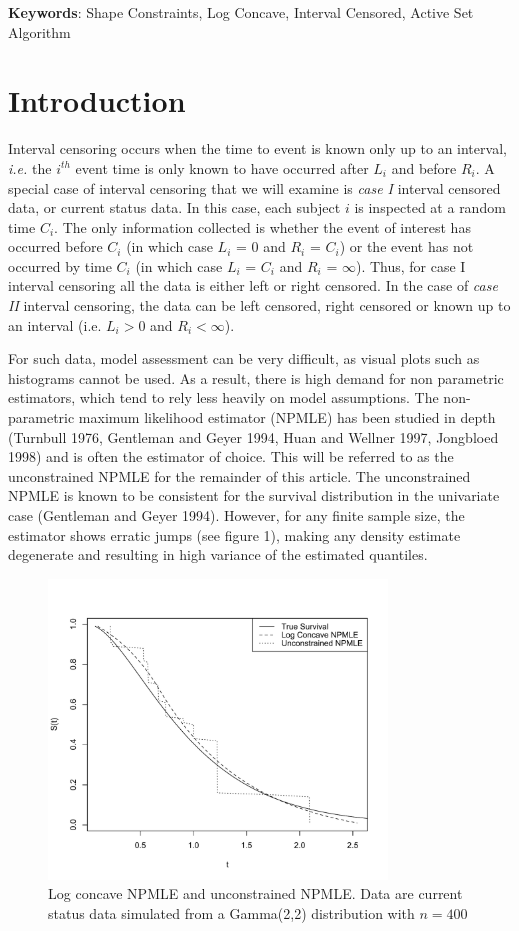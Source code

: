 \documentclass[12pt]{article}
\numberwithin{equation}{section}
\begin{document}
 {\bf Keywords}: Shape Constraints, Log Concave, Interval Censored, Active Set Algorithm

{\section{Introduction}}

	Interval censoring occurs when the time to event is known only up to an interval, \emph{i.e.} the $i^{th}$ event time is only known to have occurred after $L_{i}$ and before $R_i$. A special case of interval censoring that we will examine is {\it case I} interval censored data, or current status data. In this case, each subject $i$ is inspected at a random time $C_i$. The only information collected is whether the event of interest has occurred before $C_i$ (in which case $L_i$ = 0 and $R_i$ = $C_i$) or the event has not occurred by time $C_i$ (in which case $L_i$ = $C_i$ and $R_i$ = $\infty$). Thus, for case I interval censoring all the data is either left or right censored. In the case of {\it case II} interval censoring, the data can be left censored, right censored or known up to an interval (i.e. $L_i > 0$ and $R_i < \infty$). 
	
	For such data, model assessment can be very difficult, as visual plots such as histograms cannot be used. As a result, there is high demand for non parametric estimators, which tend to rely less heavily on model assumptions. The non-parametric maximum likelihood estimator (NPMLE) has been studied in depth (Turnbull 1976, Gentleman and Geyer 1994, Huan and Wellner 1997, Jongbloed 1998) and is often the estimator of choice. This will be referred to as the unconstrained NPMLE for the remainder of this article. The unconstrained NPMLE is known to be consistent for the survival distribution in the univariate case (Gentleman and Geyer 1994). However, for any finite sample size, the estimator shows erratic jumps (see figure 1), making any density estimate degenerate and resulting in high variance of the estimated quantiles. 
	
\begin{figure}[h]
\centerline{\includegraphics[width = 9cm]{LCvUC.pdf} }
\caption{Log concave NPMLE and unconstrained NPMLE. Data are current status data simulated from a Gamma(2,2) distribution with $n = 400$ }
\end{figure} 
			
\end{document}
